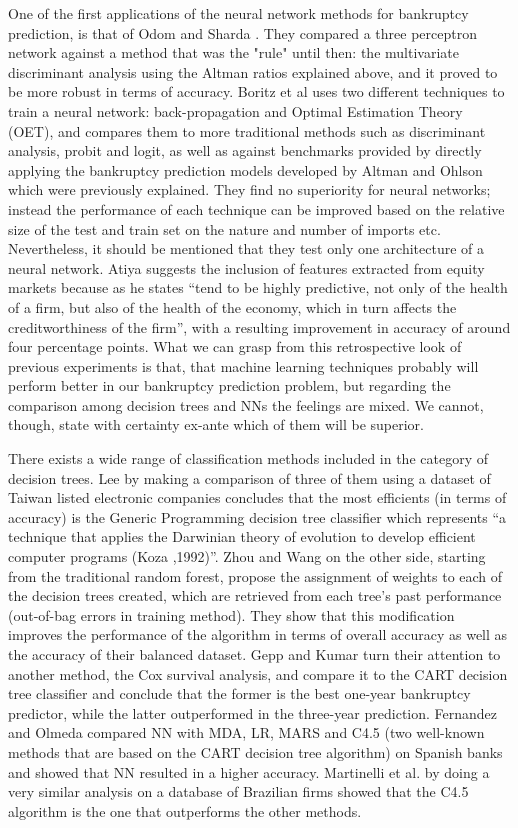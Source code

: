 One of the first applications of the neural network methods for bankruptcy prediction, is that of Odom and Sharda \cite{Odom-13}. They compared a three perceptron network against a method that was the "rule" until then: the multivariate discriminant analysis using the Altman ratios explained above, and it proved to be more robust in terms of accuracy. Boritz et al \cite{Boritz-14} uses two different techniques to train a neural network: back-propagation and Optimal Estimation Theory (OET), and compares them to more traditional methods such as discriminant analysis, probit and logit, as well as against benchmarks provided by directly applying the bankruptcy prediction models developed by Altman and Ohlson which were previously explained. They find no superiority for neural networks; instead the performance of each technique can be improved based on the relative size of the test and train set on the nature and number of imports etc. Nevertheless, it should be mentioned that they test only one architecture of a neural network.
Atiya \cite{Atiya-15} suggests the inclusion of features extracted from equity markets because as he states “tend to be highly predictive, not only of the health of a firm, but also of the health of the economy, which in turn affects the creditworthiness of the firm”, with a resulting improvement in accuracy of around four percentage points. What we can grasp from this retrospective look of previous experiments is that, that machine learning techniques probably will perform better in our bankruptcy prediction problem, but regarding the comparison among decision trees and NNs the feelings are mixed. We cannot, though, state with certainty ex-ante which of them will be superior.

There exists a wide range of classification methods included in the category of decision trees. Lee \cite{lee-bankruptcy-13} by making a comparison of three of them using a dataset of Taiwan listed electronic companies concludes that the most efficients (in terms of accuracy) is the Generic Programming decision tree classifier which represents “a technique that applies the Darwinian theory of evolution to develop efficient computer programs (Koza ,1992)”.
Zhou and Wang \cite{Zhou-10b} on the other side, starting from the traditional random forest, propose the assignment of weights to each of the decision trees created, which are retrieved from each tree’s past performance (out-of-bag errors in training method). They show that this modification improves the performance of the algorithm in terms of overall accuracy as well as the accuracy of their balanced dataset. Gepp and Kumar \cite{Gepp-10b} turn their attention to another method, the Cox survival analysis, and compare it to the CART decision tree classifier and conclude that the former is the best one-year bankruptcy predictor, while the latter outperformed in the three-year prediction. Fernandez and Olmeda \cite{Fernandez-11} compared NN with MDA, LR, MARS and C4.5 (two well-known methods that are based on the CART decision tree algorithm) on Spanish banks and showed that NN resulted in a higher accuracy. Martinelli et al. \cite{Martinelli-12} by doing a very similar analysis on a database of Brazilian firms showed that the C4.5 algorithm is the one that outperforms the other methods.

